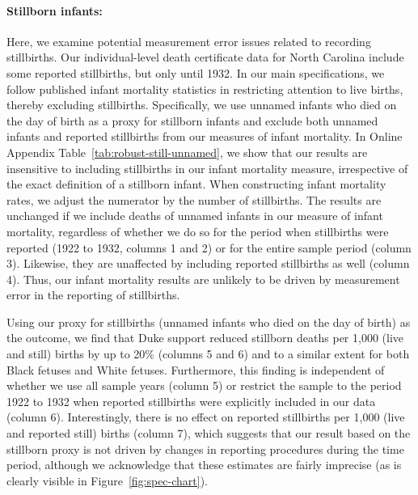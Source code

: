 \documentclass[12pt]{article}
\begin{document}
\paragraph{Stillborn infants:} Here, we examine potential measurement error issues related to recording stillbirths.
Our individual-level death certificate data for North Carolina include some reported stillbirths, but only until 1932.
In our main specifications, we follow published infant mortality statistics in restricting attention to live births, thereby excluding stillbirths.
Specifically, we use unnamed infants who died on the day of birth as a proxy for stillborn infants and exclude both unnamed infants and reported stillbirths from our measures of infant mortality.
In Online Appendix Table~\ref{tab:robust-still-unnamed}, we show that our results are insensitive to including stillbirths in our infant mortality measure, irrespective of the exact definition of a stillborn infant.
When constructing infant mortality rates, we adjust the numerator by the number of stillbirths.
The results are unchanged if we include deaths of unnamed infants in our measure of infant mortality, regardless of whether we do so for the period when stillbirths were reported (1922 to 1932, columns 1 and 2) or for the entire sample period (column 3).
Likewise, they are unaffected by including reported stillbirths as well (column 4).
Thus, our infant mortality results are unlikely to be driven by measurement error in the reporting of stillbirths.

Using our proxy for stillbirths (unnamed infants who died on the day of birth) as the outcome, we find that Duke support reduced stillborn deaths per 1,000 (live and still) births by up to 20\% (columns 5 and 6) and to a similar extent for both Black fetuses and White fetuses.
Furthermore, this finding is independent of whether we use all sample years (column 5) or restrict the sample to the period 1922 to 1932 when reported stillbirths were explicitly included in our data (column 6).
Interestingly, there is no effect on reported stillbirths per 1,000 (live and reported still) births (column 7), which suggests that our result based on the stillborn proxy is not driven by changes in reporting procedures during the time period, although we acknowledge that these estimates are fairly imprecise (as is clearly visible in Figure~\ref{fig:spec-chart}). 
\end{document}
